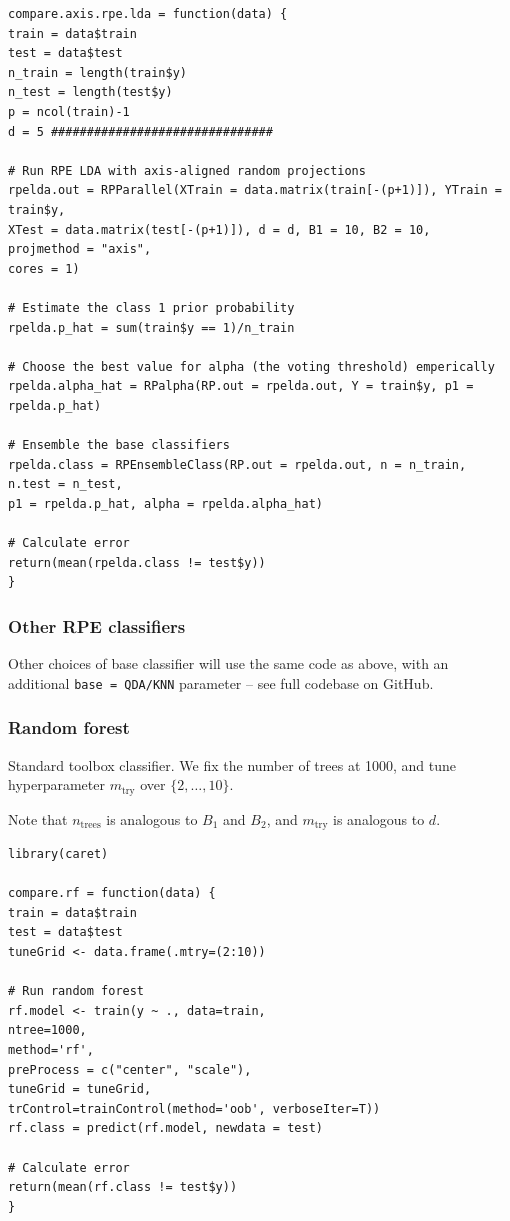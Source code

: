 \documentclass{amsart}
\begin{document}
\begin{lstlisting}[caption=Modular RPE-A with LDA testing code]
compare.axis.rpe.lda = function(data) {
train = data$train
test = data$test
n_train = length(train$y)
n_test = length(test$y)
p = ncol(train)-1
d = 5 ###############################

# Run RPE LDA with axis-aligned random projections
rpelda.out = RPParallel(XTrain = data.matrix(train[-(p+1)]), YTrain = train$y,
XTest = data.matrix(test[-(p+1)]), d = d, B1 = 10, B2 = 10,
projmethod = "axis",
cores = 1)

# Estimate the class 1 prior probability
rpelda.p_hat = sum(train$y == 1)/n_train

# Choose the best value for alpha (the voting threshold) emperically
rpelda.alpha_hat = RPalpha(RP.out = rpelda.out, Y = train$y, p1 = rpelda.p_hat)

# Ensemble the base classifiers
rpelda.class = RPEnsembleClass(RP.out = rpelda.out, n = n_train, n.test = n_test,
p1 = rpelda.p_hat, alpha = rpelda.alpha_hat)

# Calculate error
return(mean(rpelda.class != test$y))
}
\end{lstlisting}

\subsubsection{Other RPE classifiers}
Other choices of base classifier will use the same code as above, with an additional \texttt{base = QDA/KNN} parameter -- see full codebase on GitHub.


\subsubsection{Random forest}

Standard toolbox classifier. We fix the number of trees at 1000, and tune hyperparameter
$m_{\mathrm{try}}$ over $\{2,\dots,10\}$.

Note that $n_{\mathrm{trees}}$ is analogous to $B_{1}$ and $B_{2}$,
and $m_{\mathrm{try}}$ is analogous to $d$.

\begin{lstlisting}[caption=Modular random forest (via CARET) testing code]
library(caret)

compare.rf = function(data) {
train = data$train
test = data$test
tuneGrid <- data.frame(.mtry=(2:10))

# Run random forest
rf.model <- train(y ~ ., data=train,
ntree=1000,
method='rf',
preProcess = c("center", "scale"),
tuneGrid = tuneGrid,
trControl=trainControl(method='oob', verboseIter=T))
rf.class = predict(rf.model, newdata = test)

# Calculate error
return(mean(rf.class != test$y))
}
\end{lstlisting}
\end{document}
